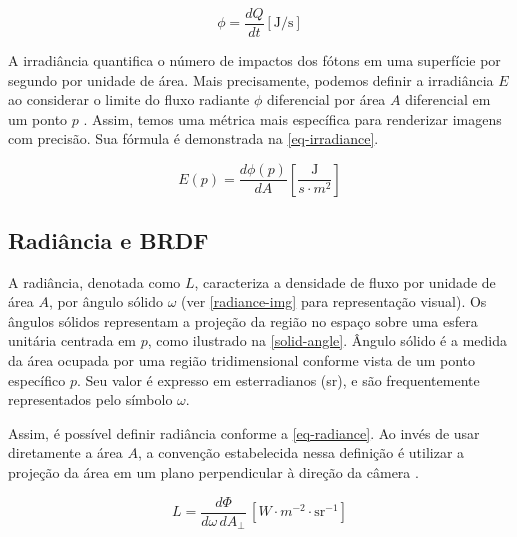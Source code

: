 \documentclass[english,
               brazil,
               bsc] %
               {dcomp-abntex2}
\begin{document}
\begin{equation} \label{eq-fluxo-radiante}
  \phi = \frac{dQ}{dt} \left[\text{J/s}\right] 
\end{equation}


A irradiância quantifica o número de impactos dos fótons em uma superfície por segundo por unidade de área. Mais precisamente, podemos definir a irradiância $E$ ao considerar o limite do fluxo radiante $\phi$ diferencial por área $A$ diferencial em um ponto $p$ \cite[~5.4.1]{pbr}. Assim, temos uma métrica mais específica para renderizar imagens com precisão. Sua fórmula é demonstrada na \autoref{eq-irradiance}.


\begin{equation} \label{eq-irradiance}
 E(p) = \frac{d\phi(p)}{dA} \left[ \frac{\text{J}} {s\cdot m^2} \right]
\end{equation}




\subsection{Radiância e BRDF} \label{brdf}


A radiância,  denotada como \( L \), caracteriza a densidade de fluxo por unidade de área \( A \), por ângulo sólido \(\omega \) (ver \autoref{radiance-img} para representação visual). Os ângulos sólidos representam a projeção da região no espaço sobre uma esfera unitária centrada em \( p \), como ilustrado na \autoref{solid-angle}. Ângulo sólido é a medida da área ocupada por uma região tridimensional conforme vista de um ponto específico \( p \). Seu valor é expresso em esterradianos (sr), e são frequentemente representados pelo símbolo \( \omega \).


Assim, é possível definir radiância conforme a \autoref{eq-radiance}. Ao invés de usar diretamente a área \( A \), a convenção estabelecida nessa definição é utilizar a projeção da área em um plano perpendicular à direção da câmera \cite{weyrich}.


\begin{equation} \label{eq-radiance}
  L = \frac{d\Phi}{d\omega \, dA_\perp} \, \left[W \cdot m^{-2} \cdot \text{sr}^{-1}\right]
\end{equation}
\end{document}
